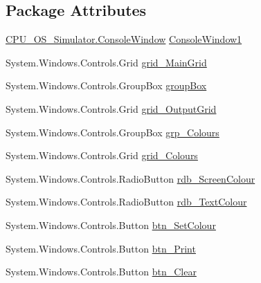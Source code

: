 \subsection*{Package Attributes}
\begin{DoxyCompactItemize}
\item 
\hyperlink{class_c_p_u___o_s___simulator_1_1_console_window}{C\+P\+U\+\_\+\+O\+S\+\_\+\+Simulator.\+Console\+Window} \hyperlink{class_c_p_u___o_s___simulator_1_1_console_window_aac987ccfb7f82cf736d42355f96e886b}{Console\+Window1}
\item 
System.\+Windows.\+Controls.\+Grid \hyperlink{class_c_p_u___o_s___simulator_1_1_console_window_a28c9b155f3287ca00079175dc675eee4}{grid\+\_\+\+Main\+Grid}
\item 
System.\+Windows.\+Controls.\+Group\+Box \hyperlink{class_c_p_u___o_s___simulator_1_1_console_window_ad2d026ec9701c1b7c36dc5038927f1ab}{group\+Box}
\item 
System.\+Windows.\+Controls.\+Grid \hyperlink{class_c_p_u___o_s___simulator_1_1_console_window_afef6d481c8b608672b98da16721143b0}{grid\+\_\+\+Output\+Grid}
\item 
System.\+Windows.\+Controls.\+Group\+Box \hyperlink{class_c_p_u___o_s___simulator_1_1_console_window_aefc749577a14756234b1a73c0a4a6f50}{grp\+\_\+\+Colours}
\item 
System.\+Windows.\+Controls.\+Grid \hyperlink{class_c_p_u___o_s___simulator_1_1_console_window_a0d262972210c72305e20330f5dda9388}{grid\+\_\+\+Colours}
\item 
System.\+Windows.\+Controls.\+Radio\+Button \hyperlink{class_c_p_u___o_s___simulator_1_1_console_window_a1ce1d3ba71dbca9bee53bf6b9c474787}{rdb\+\_\+\+Screen\+Colour}
\item 
System.\+Windows.\+Controls.\+Radio\+Button \hyperlink{class_c_p_u___o_s___simulator_1_1_console_window_a6086d1a5ddaadd584ec129c7372359e2}{rdb\+\_\+\+Text\+Colour}
\item 
System.\+Windows.\+Controls.\+Button \hyperlink{class_c_p_u___o_s___simulator_1_1_console_window_a374a86e391068f8d05edb9649ce3d7f4}{btn\+\_\+\+Set\+Colour}
\item 
System.\+Windows.\+Controls.\+Button \hyperlink{class_c_p_u___o_s___simulator_1_1_console_window_a2121b0cebbdb2d27c54073ff8dc4bb8e}{btn\+\_\+\+Print}
\item 
System.\+Windows.\+Controls.\+Button \hyperlink{class_c_p_u___o_s___simulator_1_1_console_window_ae55b34bf230bec78436130b711bbe2e2}{btn\+\_\+\+Clear}
\item 

\end{DoxyCompactItemize}
